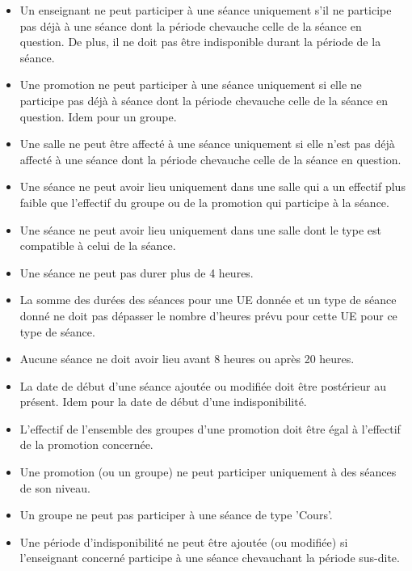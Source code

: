 \documentclass{article}
\begin{document}
\begin{itemize}
\item Un enseignant ne peut participer à une séance uniquement s'il ne participe pas déjà à une séance dont la période chevauche celle de la séance en question. De plus, il ne doit pas être indisponible durant la période de la séance.

\item Une promotion ne peut participer à une séance uniquement si elle ne participe pas déjà à séance dont la période chevauche celle de la séance en question. Idem pour un groupe.

\item Une salle ne peut être affecté à une séance uniquement si elle n'est pas déjà affecté à une séance dont la période chevauche celle de la séance en question.

\item Une séance ne peut avoir lieu uniquement dans une salle qui a un effectif plus faible que l'effectif du groupe ou de la promotion qui participe à la séance.

\item Une séance ne peut avoir lieu uniquement dans une salle dont le type est compatible à celui de la séance.

\item Une séance ne peut pas durer plus de 4 heures.

\item La somme des durées des séances pour une UE donnée et un type de séance donné ne doit pas dépasser le nombre d'heures prévu pour cette UE pour ce type de séance.

\item Aucune séance ne doit avoir lieu avant 8 heures ou après 20 heures.

\item La date de début d'une séance ajoutée ou modifiée doit être postérieur au présent. Idem pour la date de début d'une indisponibilité.

\item L'effectif de l'ensemble des groupes d'une promotion doit être égal à l'effectif de la promotion concernée.

\item Une promotion (ou un groupe) ne peut participer uniquement à des séances de son niveau.

\item Un groupe ne peut pas participer à une séance de type 'Cours'.

\item Une période d'indisponibilité ne peut être ajoutée (ou modifiée) si l'enseignant concerné participe à une séance chevauchant la période sus-dite.


\end{itemize}
\end{document}
